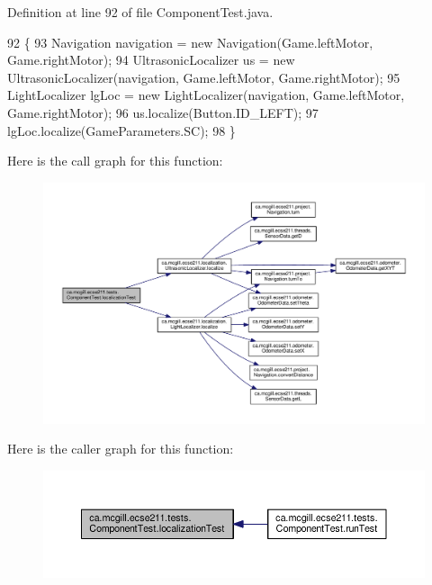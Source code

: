 Definition at line 92 of file Component\+Test.\+java.


\begin{DoxyCode}
92                                                                   \{
93     Navigation navigation = \textcolor{keyword}{new} Navigation(Game.leftMotor, Game.rightMotor);
94     UltrasonicLocalizer us = \textcolor{keyword}{new} UltrasonicLocalizer(navigation, Game.leftMotor, Game.rightMotor);
95     LightLocalizer lgLoc = \textcolor{keyword}{new} LightLocalizer(navigation, Game.leftMotor, Game.rightMotor);
96     us.localize(Button.ID\_LEFT);
97     lgLoc.localize(GameParameters.SC);
98   \}
\end{DoxyCode}
Here is the call graph for this function\+:\nopagebreak
\begin{figure}[H]
\begin{center}
\leavevmode
\includegraphics[width=350pt]{enumca_1_1mcgill_1_1ecse211_1_1tests_1_1_component_test_ad11712dd74c5c64e84cd71186a59a087_cgraph}
\end{center}
\end{figure}
Here is the caller graph for this function\+:\nopagebreak
\begin{figure}[H]
\begin{center}
\leavevmode
\includegraphics[width=350pt]{enumca_1_1mcgill_1_1ecse211_1_1tests_1_1_component_test_ad11712dd74c5c64e84cd71186a59a087_icgraph}
\end{center}
\end{figure}
\mbox{\label{enumca_1_1mcgill_1_1ecse211_1_1tests_1_1_component_test_a743c9bb90a8c8bc3fcf3b4c591990e7f}} 

